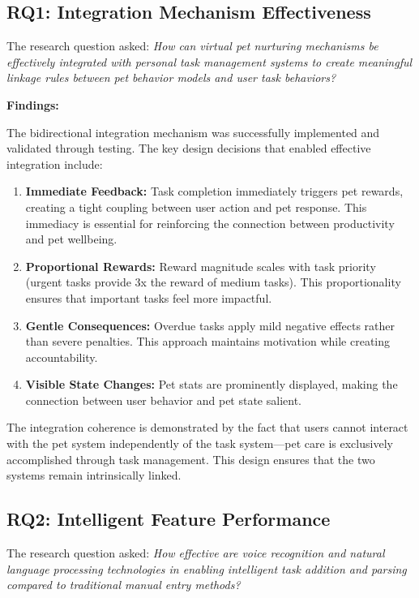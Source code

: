 \subsection{RQ1: Integration Mechanism Effectiveness}

The research question asked: \textit{How can virtual pet nurturing mechanisms be effectively integrated with personal task management systems to create meaningful linkage rules between pet behavior models and user task behaviors?}

\textbf{Findings:}

The bidirectional integration mechanism was successfully implemented and validated through testing. The key design decisions that enabled effective integration include:

\begin{enumerate}
    \item \textbf{Immediate Feedback:} Task completion immediately triggers pet rewards, creating a tight coupling between user action and pet response. This immediacy is essential for reinforcing the connection between productivity and pet wellbeing.
    
    \item \textbf{Proportional Rewards:} Reward magnitude scales with task priority (urgent tasks provide 3x the reward of medium tasks). This proportionality ensures that important tasks feel more impactful.
    
    \item \textbf{Gentle Consequences:} Overdue tasks apply mild negative effects rather than severe penalties. This approach maintains motivation while creating accountability.
    
    \item \textbf{Visible State Changes:} Pet stats are prominently displayed, making the connection between user behavior and pet state salient.
\end{enumerate}

The integration coherence is demonstrated by the fact that users cannot interact with the pet system independently of the task system---pet care is exclusively accomplished through task management. This design ensures that the two systems remain intrinsically linked.

\subsection{RQ2: Intelligent Feature Performance}

The research question asked: \textit{How effective are voice recognition and natural language processing technologies in enabling intelligent task addition and parsing compared to traditional manual entry methods?}

